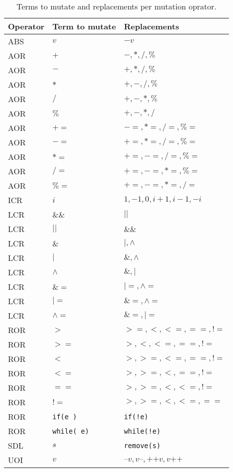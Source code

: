 
\begin{table}[h]
\scriptsize
\centering
\caption{Terms to mutate and replacements per mutation oprator.}
\label{table:operators:terms}

\begin{tabular}{lll}
\hline 
\textbf{Operator}	&	\textbf{Term to mutate}	&	\textbf{Replacements}\\
\hline 
ABS	&	$v$	&	$-v$	\\
AOR	&	$+$	&	$ -,*,/,\% $	\\
AOR	&	$-$	&	$ +,*,/,\% $	\\
AOR	&	$*$	&	$ +,-,/,\% $	\\
AOR	&	$/$	&	$ +,-,*,\% $	\\
AOR	&	$\%$	&	$ +,-,*,/ $	\\
AOR	&	$+=$	&	$ -=,*=,/=,\%= $	\\
AOR	&	$-=$	&	$ +=,*=,/=,\%= $	\\
AOR	&	$*=$	&	$ +=,-=,/=,\%= $	\\
AOR	&	$/=$	&	$ +=,-=,*=,\%= $	\\
AOR	&	$\%=$	&	$ +=,-=,*=,/= $	\\
ICR	&	$i$	&	$ 1, -1, 0, i+1, i-1, -i $	\\
LCR	&	$\&\&$	&	$||$	\\
LCR	&	$||$	&	$\&\&$	\\
LCR	&	$\&$	&	$ |,\land $	\\
LCR	&	$|$	&	$ \&,\land $	\\
LCR	&	$\land$	&	$ \&,| $	\\
LCR	&	$\&=$	&	$ |=, \land= $	\\
LCR	&	$|=$	&	$ \&=, \land= $	\\
LCR	&	$\land=$	&	$ \&=, |= $	\\
ROR	&	$>$	&	$ >=, <, <=, ==, != $	\\
ROR	&	$>=$	&	$ >, <, <=, ==, != $	\\
ROR	&	$<$	&	$ >, >=, <=, ==, != $	\\
ROR	&	$<=$	&	$ >, >=, <, ==, != $	\\
ROR	&	$==$	&	$ >, >=, <, <=, != $	\\
ROR	&	$!=$	&	$ >, >=, <, <=, == $	\\
ROR	&	\texttt{if(e )}	&	\texttt{if(!e)}	\\
ROR	&	\texttt{while( e)}	&	\texttt{while(!e)}	\\
SDL	&	$s$	&	\texttt{remove(s)}	\\
UOI	&	$v$	&	$ \texttt{--}v, v\texttt{--}, \texttt{++}v, v\texttt{++} $	\\

\end{tabular}
\end{table}
